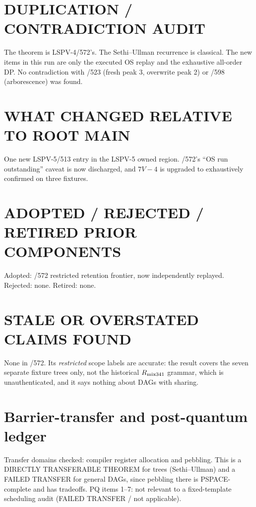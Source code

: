 \documentclass[11pt]{article}
\begin{document}
\section*{DUPLICATION / CONTRADICTION AUDIT}
The theorem is LSPV-4/572's. The Sethi--Ullman recurrence is classical. The new items in this run are only the executed OS replay and the exhaustive all-order DP. No contradiction with /523 (fresh peak 3, overwrite peak 2) or /598 (arborescence) was found.

\section*{WHAT CHANGED RELATIVE TO ROOT MAIN}
One new LSPV-5/513 entry in the LSPV-5 owned region. /572's ``OS run outstanding'' caveat is now discharged, and $7V-4$ is upgraded to exhaustively confirmed on three fixtures.

\section*{ADOPTED / REJECTED / RETIRED PRIOR COMPONENTS}
Adopted: /572 restricted retention frontier, now independently replayed. Rejected: none. Retired: none.

\section*{STALE OR OVERSTATED CLAIMS FOUND}
None in /572. Its \emph{restricted} scope labels are accurate: the result covers the seven separate fixture trees only, not the historical $R_{\rm mix341}$ grammar, which is unauthenticated, and it says nothing about DAGs with sharing.

\section*{Barrier-transfer and post-quantum ledger}
Transfer domains checked: compiler register allocation and pebbling. This is a DIRECTLY TRANSFERABLE THEOREM for trees (Sethi--Ullman) and a FAILED TRANSFER for general DAGs, since pebbling there is PSPACE-complete and has tradeoffs. PQ items 1--7: not relevant to a fixed-template scheduling audit (FAILED TRANSFER / not applicable).
\end{document}
